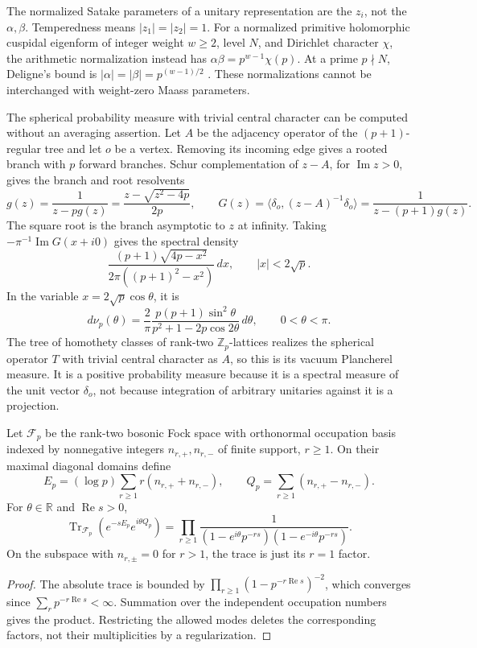 The normalized Satake parameters of a unitary representation are the $z_i$,
not the $\alpha,\beta$.  Temperedness means $|z_1|=|z_2|=1$.
For a normalized primitive holomorphic cuspidal eigenform of integer weight $w\geq2$, level $N$, and Dirichlet character $\chi$, the arithmetic normalization instead has $\alpha\beta=p^{w-1}\chi(p)$. At a prime $p\nmid N$, Deligne's bound is
$|\alpha|=|\beta|=p^{(w-1)/2}$ \cite[Theorem~8.2, p.~302]{syn-arith:Deligne}.
These normalizations cannot be interchanged with weight-zero Maass parameters.

The spherical probability measure with trivial central character can be
computed without an averaging assertion.  Let $A$ be the adjacency operator
of the $(p+1)$-regular tree and let $o$ be a vertex.
Removing its incoming edge gives a rooted branch with $p$ forward branches.
Schur complementation of $z-A$, for $\operatorname{Im}z>0$, gives the branch
and root resolvents
\[
 g(z)=\frac1{z-pg(z)}
     =\frac{z-\sqrt{z^2-4p}}{2p},\qquad
 G(z)=\langle\delta_o,(z-A)^{-1}\delta_o\rangle
     =\frac1{z-(p+1)g(z)}.
\]
The square root is the branch asymptotic to $z$ at infinity.
Taking $-\pi^{-1}\operatorname{Im}G(x+i0)$ gives the spectral density
\[
 \frac{(p+1)\sqrt{4p-x^2}}{2\pi((p+1)^2-x^2)}\,dx,
 \qquad |x|<2\sqrt p.
\]
In the variable $x=2\sqrt p\cos\theta$, it is
\[
 d\nu_p(\theta)=\frac2\pi
 \frac{p(p+1)\sin^2\theta}{p^2+1-2p\cos2\theta}\,d\theta,
 \qquad 0<\theta<\pi.
\]
The tree of homothety classes of rank-two $\mathbb Z_p$-lattices realizes
the spherical operator $T$ with trivial central character as $A$, so this
is its vacuum Plancherel measure.
It is a positive probability measure because it is a spectral measure of
the unit vector $\delta_o$, not because integration of arbitrary unitaries
against it is a projection.

\begin{proposition}
\label{syn-arith:fock}
Let $\mathcal F_p$ be the rank-two bosonic Fock space with orthonormal occupation
basis indexed by nonnegative integers $n_{r,+},n_{r,-}$ of finite support,
$r\geq1$.  On their maximal diagonal domains define
\[
 E_p=(\log p)\sum_{r\geq1}r(n_{r,+}+n_{r,-}),\qquad
 Q_p=\sum_{r\geq1}(n_{r,+}-n_{r,-}).
\]
For $\theta\in\mathbb R$ and $\operatorname{Re}s>0$,
\[
 \operatorname{Tr}_{\mathcal F_p}(e^{-sE_p}e^{i\theta Q_p})
 =\prod_{r\geq1}\frac1{(1-e^{i\theta}p^{-rs})(1-e^{-i\theta}p^{-rs})}.
\]
On the subspace with $n_{r,\pm}=0$ for $r>1$, the trace is just its $r=1$ factor.
\end{proposition}
\begin{proof}
The absolute trace is bounded by
$\prod_{r\geq1}(1-p^{-r\operatorname{Re}s})^{-2}$, which converges since
$\sum_rp^{-r\operatorname{Re}s}<\infty$.  Summation over the independent
occupation numbers gives the product.  Restricting the allowed modes deletes
the corresponding factors, not their multiplicities by a regularization.
\end{proof}

